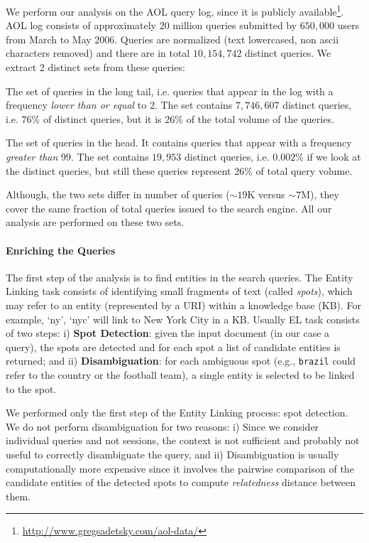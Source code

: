 We perform our analysis on the AOL query log, since it is publicly available\footnote{\url{http://www.gregsadetsky.com/aol-data/}}. AOL log consists of approximately 20 million queries submitted by $650,000$ users from March to May 2006. Queries are normalized (text lowercased, non ascii characters removed) and there are in total $10,154,742$ distinct queries. 
We extract 2 distinct sets from these queries: 
\begin{description}
	\item{\tail{}} The set of queries in the long tail, i.e. queries that appear in the log with a frequency \emph{lower than or equal} to $2$. The set contains $7,746,607$ distinct queries, i.e. $76\%$ of distinct queries, but it is $26\%$ of the total volume of the queries.
	\item{\head{}} The set of queries in the head. It contains queries that appear with a frequency \emph{greater than} $99$. The set contains $19,953$ distinct queries, i.e. $0.002\%$ if we look at the distinct queries, but still these queries represent $26\%$ of total query volume.%
\end{description}
Although, the two sets differ in number of queries ($\sim19$K versus $\sim7$M), they cover the same fraction of total queries issued to the search engine. All our analysis are performed on these two sets.

\paragraph{Enriching the Queries}
The first step of the analysis is to find entities in the search queries.  
The Entity Linking task consists of identifying small fragments of text (called \emph{spots}), which may refer to an entity (represented by a URI) within a knowledge base (KB). For example, `ny', `nyc' will link to New York City in a KB. 
Usually EL task consists of two steps: i) \textbf{Spot Detection}: given the input document (in our case a query), 
the spots are detected and for each spot a list of candidate entities is returned; and ii) \textbf{Disambiguation}:
for each ambiguous spot (e.g., \texttt{brazil} could refer to the country or the football team), a single entity is 
selected to be linked to the spot.

We performed only the first step of the Entity Linking process: spot detection. 
We do not perform disambiguation for two reasons: i) Since we consider individual queries and not sessions, the context is not sufficient and probably not useful to correctly disambiguate the query, and ii) Disambiguation is usually computationally more expensive
since it involves the pairwise comparison of the candidate entities of the detected spots to compute \emph{relatedness}\cite{milne2008learning} distance between them.

